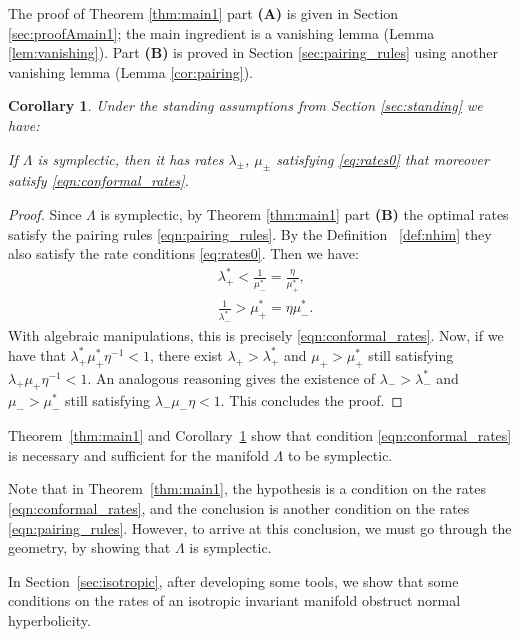 \documentclass[11pt]{amsart}
\newtheorem{cor}[thm]{Corollary}
\theoremstyle{definition}
\theoremstyle{remark}
\numberwithin{equation}{section}
\begin{document}
The proof of Theorem \ref{thm:main1} part {\bf(A)} is given in Section \ref{sec:proofAmain1}; the main ingredient   is a  vanishing lemma (Lemma \ref{lem:vanishing}). Part {\bf(B)} is proved in Section \ref{sec:pairing_rules} using another
vanishing lemma (Lemma \ref{cor:pairing}).

\begin{cor} \label{partial_converse}
Under  the standing assumptions from Section \ref{sec:standing} we have:


If $\Lambda$ is symplectic, then  it  has rates $\lambda_\pm$, $\mu_\pm$ satisfying \eqref{eq:rates0} that moreover satisfy
\eqref{eqn:conformal_rates}.
\end{cor}



\begin{proof}
Since $\Lambda$ is symplectic, by  Theorem \ref{thm:main1} part {\bf(B)}   the optimal rates satisfy the pairing rules \eqref{eqn:pairing_rules}.
By the Definition ~\ref{def:nhim} they also satisfy the rate conditions \eqref{eq:rates0}.
Then we have:
\[
\begin{split}
&\lambda^*_+ < \frac{1}{\mu^*_-}  = \frac{\eta}{\mu^*_+}, \\
&\frac{1}{\lambda^*_-} > \mu^*_+  =  {\eta}{\mu^*_-}.
\end{split}
\]
With algebraic manipulations,   this is precisely \eqref{eqn:conformal_rates}.
Now, if we have that $\lambda_+^*\mu_+^*\eta^{-1}<1$, there exist $\lambda_+>\lambda_+^*$ and $\mu_+>\mu_+^*$ still satisfying
$\lambda_+\mu_+\eta^{-1}<1$.
An analogous reasoning gives the existence of $\lambda_->\lambda_-^*$ and $\mu_->\mu_-^*$  still satisfying
$\lambda_-\mu_-\eta<1$.
This concludes the proof.
\end{proof}


Theorem~\ref{thm:main1} and Corollary~\ref{partial_converse} show that condition \eqref{eqn:conformal_rates}
is necessary and sufficient for the manifold $\Lambda$ to be symplectic.

Note that in Theorem~\ref{thm:main1}, the hypothesis is a condition on the rates \ref{eqn:conformal_rates}, and the conclusion is another condition on the rates \eqref{eqn:pairing_rules}. However, to arrive at this conclusion, we must go through the geometry, by showing that
$\Lambda$ is symplectic.

In Section~\ref{sec:isotropic}, after developing some tools, we show that some conditions on the rates of an isotropic invariant manifold    obstruct normal hyperbolicity.
\end{document}
